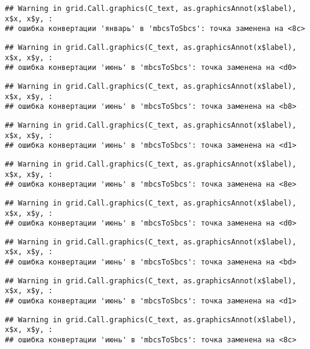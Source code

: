 \documentclass[
]{article}
\begin{document}
\begin{verbatim}
## Warning in grid.Call.graphics(C_text, as.graphicsAnnot(x$label), x$x, x$y, :
## ошибка конвертации 'январь' в 'mbcsToSbcs': точка заменена на <8c>
\end{verbatim}

\begin{verbatim}
## Warning in grid.Call.graphics(C_text, as.graphicsAnnot(x$label), x$x, x$y, :
## ошибка конвертации 'июнь' в 'mbcsToSbcs': точка заменена на <d0>
\end{verbatim}

\begin{verbatim}
## Warning in grid.Call.graphics(C_text, as.graphicsAnnot(x$label), x$x, x$y, :
## ошибка конвертации 'июнь' в 'mbcsToSbcs': точка заменена на <b8>
\end{verbatim}

\begin{verbatim}
## Warning in grid.Call.graphics(C_text, as.graphicsAnnot(x$label), x$x, x$y, :
## ошибка конвертации 'июнь' в 'mbcsToSbcs': точка заменена на <d1>
\end{verbatim}

\begin{verbatim}
## Warning in grid.Call.graphics(C_text, as.graphicsAnnot(x$label), x$x, x$y, :
## ошибка конвертации 'июнь' в 'mbcsToSbcs': точка заменена на <8e>
\end{verbatim}

\begin{verbatim}
## Warning in grid.Call.graphics(C_text, as.graphicsAnnot(x$label), x$x, x$y, :
## ошибка конвертации 'июнь' в 'mbcsToSbcs': точка заменена на <d0>
\end{verbatim}

\begin{verbatim}
## Warning in grid.Call.graphics(C_text, as.graphicsAnnot(x$label), x$x, x$y, :
## ошибка конвертации 'июнь' в 'mbcsToSbcs': точка заменена на <bd>
\end{verbatim}

\begin{verbatim}
## Warning in grid.Call.graphics(C_text, as.graphicsAnnot(x$label), x$x, x$y, :
## ошибка конвертации 'июнь' в 'mbcsToSbcs': точка заменена на <d1>
\end{verbatim}

\begin{verbatim}
## Warning in grid.Call.graphics(C_text, as.graphicsAnnot(x$label), x$x, x$y, :
## ошибка конвертации 'июнь' в 'mbcsToSbcs': точка заменена на <8c>
\end{verbatim}
\end{document}
